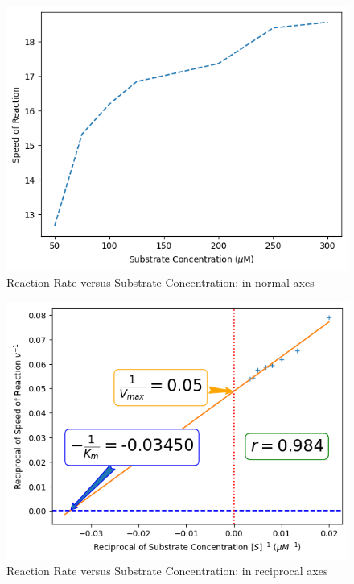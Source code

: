 \documentclass{report}
\begin{document}
\begin{figure}
    \centering
    \includegraphics[width=1\linewidth]{../Figures/substrate2.png}
    \caption{Reaction Rate versus Substrate Concentration: in normal axes}
    \label{Reaction Rate versus Substrate Concentration: in normal axes}
\end{figure}

\begin{figure}
    \centering
    \includegraphics[width=1\linewidth]{../Figures/substrate3.png}
    \caption{Reaction Rate versus Substrate Concentration: in reciprocal axes}
    \label{Reaction Rate versus Substrate Concentration: in reciprocall axes}
\end{figure}
\end{document}
